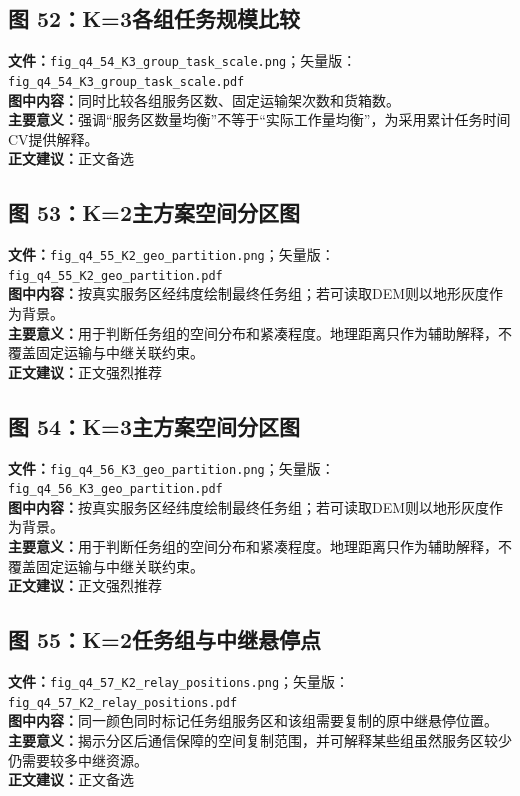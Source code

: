 \subsection*{图 52：K=3各组任务规模比较}
\textbf{文件：}\texttt{fig\_q4\_54\_K3\_group\_task\_scale.png}；矢量版：\texttt{fig\_q4\_54\_K3\_group\_task\_scale.pdf}\\
\textbf{图中内容：}同时比较各组服务区数、固定运输架次数和货箱数。\\
\textbf{主要意义：}强调“服务区数量均衡”不等于“实际工作量均衡”，为采用累计任务时间CV提供解释。\\
\textbf{正文建议：}正文备选

\subsection*{图 53：K=2主方案空间分区图}
\textbf{文件：}\texttt{fig\_q4\_55\_K2\_geo\_partition.png}；矢量版：\texttt{fig\_q4\_55\_K2\_geo\_partition.pdf}\\
\textbf{图中内容：}按真实服务区经纬度绘制最终任务组；若可读取DEM则以地形灰度作为背景。\\
\textbf{主要意义：}用于判断任务组的空间分布和紧凑程度。地理距离只作为辅助解释，不覆盖固定运输与中继关联约束。\\
\textbf{正文建议：}正文强烈推荐

\subsection*{图 54：K=3主方案空间分区图}
\textbf{文件：}\texttt{fig\_q4\_56\_K3\_geo\_partition.png}；矢量版：\texttt{fig\_q4\_56\_K3\_geo\_partition.pdf}\\
\textbf{图中内容：}按真实服务区经纬度绘制最终任务组；若可读取DEM则以地形灰度作为背景。\\
\textbf{主要意义：}用于判断任务组的空间分布和紧凑程度。地理距离只作为辅助解释，不覆盖固定运输与中继关联约束。\\
\textbf{正文建议：}正文强烈推荐

\subsection*{图 55：K=2任务组与中继悬停点}
\textbf{文件：}\texttt{fig\_q4\_57\_K2\_relay\_positions.png}；矢量版：\texttt{fig\_q4\_57\_K2\_relay\_positions.pdf}\\
\textbf{图中内容：}同一颜色同时标记任务组服务区和该组需要复制的原中继悬停位置。\\
\textbf{主要意义：}揭示分区后通信保障的空间复制范围，并可解释某些组虽然服务区较少仍需要较多中继资源。\\
\textbf{正文建议：}正文备选

